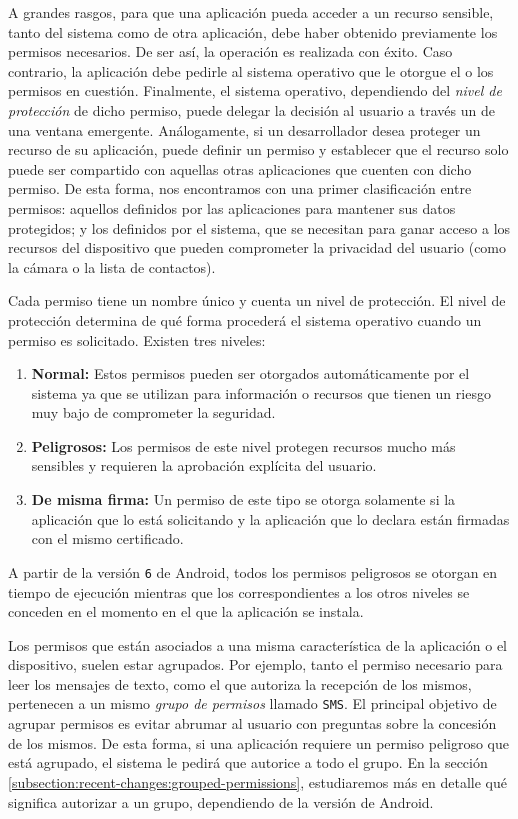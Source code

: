 A grandes rasgos, para que una aplicación pueda acceder a un recurso sensible, tanto del sistema como de
otra aplicación, debe haber obtenido previamente los permisos necesarios. De ser así, la operación es
realizada con éxito. Caso contrario, la aplicación debe pedirle al sistema operativo que le otorgue el o
los permisos en cuestión. Finalmente, el sistema operativo, dependiendo del \textit{nivel de protección}
de dicho permiso, puede delegar la decisión al usuario a través un de una ventana emergente.
Análogamente, si un desarrollador desea proteger un recurso de su aplicación, puede definir un permiso y
establecer que el recurso solo puede ser compartido con aquellas otras aplicaciones que cuenten con dicho
permiso. De esta forma, nos encontramos con una primer clasificación entre permisos: aquellos definidos
por las aplicaciones para mantener sus datos protegidos; y los definidos por el sistema, que se necesitan
para ganar acceso a los recursos del dispositivo que pueden comprometer la privacidad del usuario (como
la cámara o la lista de contactos).

Cada permiso tiene un nombre único y cuenta un nivel de protección. El nivel de protección determina de
qué forma procederá el sistema operativo cuando un permiso es solicitado. Existen tres niveles:

\begin{enumerate}
    \item \textbf{Normal:} Estos permisos pueden ser otorgados automáticamente por el sistema ya que se
          utilizan para información o recursos que tienen un riesgo muy bajo de comprometer la seguridad.
    \item \textbf{Peligrosos:} Los permisos de este nivel protegen recursos mucho más sensibles y
          requieren la aprobación explícita del usuario.
    \item \textbf{De misma firma:} Un permiso de este tipo se otorga solamente si la aplicación que lo
          está solicitando y la aplicación que lo declara están firmadas con el mismo certificado.
\end{enumerate}

A partir de la versión \texttt{6} de Android, todos los permisos peligrosos se otorgan en tiempo de
ejecución mientras que los correspondientes a los otros niveles se conceden en el momento en el que la
aplicación se instala.

Los permisos que están asociados a una misma característica de la aplicación o el dispositivo, suelen
estar agrupados. Por ejemplo, tanto el permiso necesario para leer los mensajes de texto, como el que
autoriza la recepción de los mismos, pertenecen a un mismo \textit{grupo de permisos} llamado
\texttt{SMS}. El principal objetivo de agrupar permisos es evitar abrumar al usuario con preguntas sobre
la concesión de los mismos. De esta forma, si una aplicación requiere un permiso peligroso que está
agrupado, el sistema le pedirá que autorice a todo el grupo. En la sección
\ref{subsection:recent-changes:grouped-permissions}, estudiaremos más en detalle qué significa autorizar
a un grupo, dependiendo de la versión de Android.

